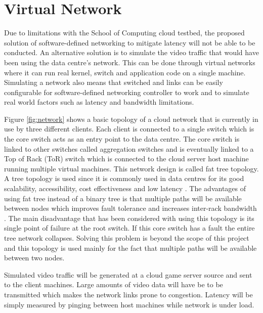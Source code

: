 \section{Virtual Network}
Due to limitations with the School of Computing cloud testbed, the proposed solution of software-defined networking to mitigate latency will not be able to be conducted. An alternative solution is to simulate the video traffic that would have been using the data centre's network. This can be done through virtual networks where it can run real kernel, switch and application code on a single machine. Simulating a network also means that switched and links can be easily configurable for software-defined networking controller to work and to simulate real world factors such as latency and bandwidth limitations.
\newline
\par
Figure \ref{fig:network} shows a basic topology of a cloud network that is currently in use by three different clients. Each client is connected to a single switch which is the core switch acts as an entry point to the data centre. The core switch is linked to other switches called aggregation switches and is eventually linked to a Top of Rack (ToR) switch which is connected to the cloud server host machine running multiple virtual machines. This network design is called fat tree topology. A tree topology is used since it is commonly used in data centres for its good scalability, accessibility, cost effectiveness and low latency \cite{wu2015cloud}. The advantages of using fat tree instead of a binary tree is that multiple paths will be available between nodes which improves fault tolerance and increases inter-rack bandwidth \cite{al2008scalable}. The main disadvantage that has been considered with using this topology is its single point of failure at the root switch. If this core switch has a fault the entire tree network collapses. Solving this problem is beyond the scope of this project and this topology is used mainly for the fact that multiple paths will be available between two nodes.
\newline
\par
Simulated video traffic will be generated at a cloud game server source and sent to the client machines. Large amounts of video data will have be to be transmitted which makes the network links prone to congestion. Latency will be simply measured by pinging between host machines while network is under load.

